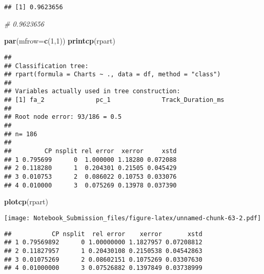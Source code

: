 \documentclass[
]{article}
\newenvironment{Shaded}{\begin{snugshade}}{\end{snugshade}}
\newcommand{\CommentTok}[1]{\textcolor[rgb]{0.56,0.35,0.01}{\textit{#1}}}
\newcommand{\DataTypeTok}[1]{\textcolor[rgb]{0.13,0.29,0.53}{#1}}
\newcommand{\DecValTok}[1]{\textcolor[rgb]{0.00,0.00,0.81}{#1}}
\newcommand{\KeywordTok}[1]{\textcolor[rgb]{0.13,0.29,0.53}{\textbf{#1}}}
\newcommand{\NormalTok}[1]{#1}
\newcommand{\OperatorTok}[1]{\textcolor[rgb]{0.81,0.36,0.00}{\textbf{#1}}}
\newcommand{\StringTok}[1]{\textcolor[rgb]{0.31,0.60,0.02}{#1}}
\begin{document}
\begin{verbatim}
## [1] 0.9623656
\end{verbatim}

\begin{Shaded}
\begin{Highlighting}[]
\CommentTok{# 0.9623656}

\KeywordTok{par}\NormalTok{(}\DataTypeTok{mfrow=}\KeywordTok{c}\NormalTok{(}\DecValTok{1}\NormalTok{,}\DecValTok{1}\NormalTok{))}
\KeywordTok{printcp}\NormalTok{(rpart)}
\end{Highlighting}
\end{Shaded}

\begin{verbatim}
## 
## Classification tree:
## rpart(formula = Charts ~ ., data = df, method = "class")
## 
## Variables actually used in tree construction:
## [1] fa_2              pc_1              Track_Duration_ms
## 
## Root node error: 93/186 = 0.5
## 
## n= 186 
## 
##         CP nsplit rel error  xerror     xstd
## 1 0.795699      0  1.000000 1.18280 0.072088
## 2 0.118280      1  0.204301 0.21505 0.045429
## 3 0.010753      2  0.086022 0.10753 0.033076
## 4 0.010000      3  0.075269 0.13978 0.037390
\end{verbatim}

\begin{Shaded}
\begin{Highlighting}[]
\KeywordTok{plotcp}\NormalTok{(rpart)}
\end{Highlighting}
\end{Shaded}

\texttt{[image: Notebook\_Submission\_files/figure-latex/unnamed-chunk-63-2.pdf]}

\begin{Shaded}
\end{Shaded}

\begin{verbatim}
##           CP nsplit  rel error    xerror       xstd
## 1 0.79569892      0 1.00000000 1.1827957 0.07208812
## 2 0.11827957      1 0.20430108 0.2150538 0.04542863
## 3 0.01075269      2 0.08602151 0.1075269 0.03307630
## 4 0.01000000      3 0.07526882 0.1397849 0.03738999
\end{verbatim}

\begin{Shaded}
\end{Shaded}
\end{document}
